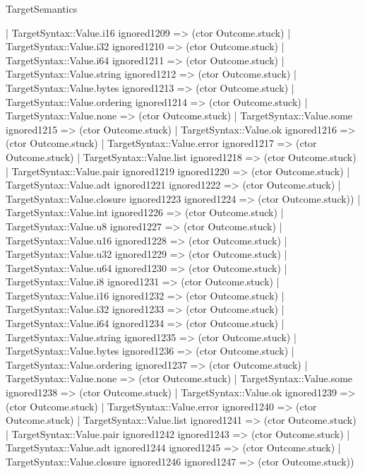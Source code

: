 \begin{lexlean}{TargetSemantics}
\begin{semanticmodule}
{              | TargetSyntax::Value.i16 ignored1209 => (ctor Outcome.stuck)
              | TargetSyntax::Value.i32 ignored1210 => (ctor Outcome.stuck)
              | TargetSyntax::Value.i64 ignored1211 => (ctor Outcome.stuck)
              | TargetSyntax::Value.string ignored1212 => (ctor Outcome.stuck)
              | TargetSyntax::Value.bytes ignored1213 => (ctor Outcome.stuck)
              | TargetSyntax::Value.ordering ignored1214 => (ctor Outcome.stuck)
              | TargetSyntax::Value.none => (ctor Outcome.stuck)
              | TargetSyntax::Value.some ignored1215 => (ctor Outcome.stuck)
              | TargetSyntax::Value.ok ignored1216 => (ctor Outcome.stuck)
              | TargetSyntax::Value.error ignored1217 => (ctor Outcome.stuck)
              | TargetSyntax::Value.list ignored1218 => (ctor Outcome.stuck)
              | TargetSyntax::Value.pair ignored1219 ignored1220 => (ctor Outcome.stuck)
              | TargetSyntax::Value.adt ignored1221 ignored1222 => (ctor Outcome.stuck)
              | TargetSyntax::Value.closure ignored1223 ignored1224 => (ctor Outcome.stuck))
            | TargetSyntax::Value.int ignored1226 => (ctor Outcome.stuck)
            | TargetSyntax::Value.u8 ignored1227 => (ctor Outcome.stuck)
            | TargetSyntax::Value.u16 ignored1228 => (ctor Outcome.stuck)
            | TargetSyntax::Value.u32 ignored1229 => (ctor Outcome.stuck)
            | TargetSyntax::Value.u64 ignored1230 => (ctor Outcome.stuck)
            | TargetSyntax::Value.i8 ignored1231 => (ctor Outcome.stuck)
            | TargetSyntax::Value.i16 ignored1232 => (ctor Outcome.stuck)
            | TargetSyntax::Value.i32 ignored1233 => (ctor Outcome.stuck)
            | TargetSyntax::Value.i64 ignored1234 => (ctor Outcome.stuck)
            | TargetSyntax::Value.string ignored1235 => (ctor Outcome.stuck)
            | TargetSyntax::Value.bytes ignored1236 => (ctor Outcome.stuck)
            | TargetSyntax::Value.ordering ignored1237 => (ctor Outcome.stuck)
            | TargetSyntax::Value.none => (ctor Outcome.stuck)
            | TargetSyntax::Value.some ignored1238 => (ctor Outcome.stuck)
            | TargetSyntax::Value.ok ignored1239 => (ctor Outcome.stuck)
            | TargetSyntax::Value.error ignored1240 => (ctor Outcome.stuck)
            | TargetSyntax::Value.list ignored1241 => (ctor Outcome.stuck)
            | TargetSyntax::Value.pair ignored1242 ignored1243 => (ctor Outcome.stuck)
            | TargetSyntax::Value.adt ignored1244 ignored1245 => (ctor Outcome.stuck)
            | TargetSyntax::Value.closure ignored1246 ignored1247 => (ctor Outcome.stuck))
}
\end{semanticmodule}
\end{lexlean}
